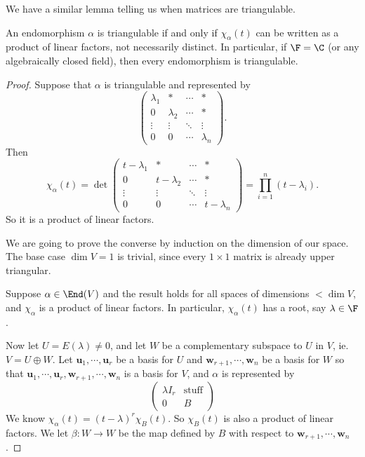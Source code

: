 \documentclass[a4paper]{article}
\begin{document}
We have a similar lemma telling us when matrices are triangulable.

\begin{lemma}
  An endomorphism $\alpha$ is triangulable if and only if $\chi_\alpha(t)$ can be written as a product of linear factors, not necessarily distinct. In particular, if $\F = \C$ (or any algebraically closed field), then every endomorphism is triangulable.
\end{lemma}

\begin{proof}
  Suppose that $\alpha$ is triangulable and represented by
  \[
    \begin{pmatrix}
      \lambda_1 & * & \cdots & *\\
      0 & \lambda_2 & \cdots & *\\
      \vdots & \vdots & \ddots & \vdots\\
      0 & 0 & \cdots & \lambda_n
    \end{pmatrix}.
  \]
  Then
  \[
    \chi_\alpha(t) = \det
    \begin{pmatrix}
      t - \lambda_1 & * & \cdots & *\\
      0 & t - \lambda_2 & \cdots & *\\
      \vdots & \vdots & \ddots & \vdots\\
      0 & 0 & \cdots & t - \lambda_n
    \end{pmatrix} =
    \prod_{i = 1}^n (t - \lambda_i).
  \]
  So it is a product of linear factors.

  We are going to prove the converse by induction on the dimension of our space. The base case $\dim V = 1$ is trivial, since every $1\times 1$ matrix is already upper triangular.

  Suppose $\alpha \in \End(V)$ and the result holds for all spaces of dimensions $< \dim V$, and $\chi_\alpha$ is a product of linear factors. In particular, $\chi_\alpha(t)$ has a root, say $\lambda \in \F$.

  Now let $U = E(\lambda) \not= 0$, and let $W$ be a complementary subspace to $U$ in $V$, ie. $V = U \oplus W$. Let $\mathbf{u}_1, \cdots, \mathbf{u}_r$ be a basis for $U$ and $\mathbf{w}_{r + 1}, \cdots, \mathbf{w}_n$ be a basis for $W$ so that $\mathbf{u}_1, \cdots, \mathbf{u}_{r}, \mathbf{w}_{r + 1}, \cdots, \mathbf{w}_n$ is a basis for $V$, and $\alpha$ is represented by
  \[
    \begin{pmatrix}
      \lambda I_r & \text{stuff}\\
      0 & B
    \end{pmatrix}
  \]
  We know $\chi_\alpha(t) = (t - \lambda)^r \chi_B(t)$. So $\chi_B(t)$ is also a product of linear factors. We let $\beta: W\to W$ be the map defined by $B$ with respect to $\mathbf{w}_{r + 1}, \cdots, \mathbf{w}_n$.


\end{proof}
\end{document}
